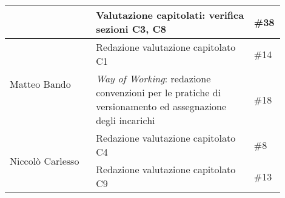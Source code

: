 \begin{center}
{\begin{tabular}{p{0.30\linewidth}|p{0.55\linewidth}|p{0.05\linewidth}}
        \cline{2-3}
                 		& Valutazione capitolati: verifica sezioni C3, C8 						& \#38  \\
        \hline
        \multirow{2}{*}{Matteo Bando}           & Redazione valutazione capitolato C1 			& \#14  \\
        \cline{2-3}
                    	& \textit{Way of Working}: redazione convenzioni per le pratiche di versionamento ed assegnazione degli incarichi 				& \#18 \\
        \hline
        \multirow{2}{*}{Niccolò Carlesso}       & Redazione valutazione capitolato C4 			& \#8   \\
        \cline{2-3}
        		        & Redazione valutazione capitolato C9 									& \#13  \\
    \end{tabular}
    }
    \end{center}